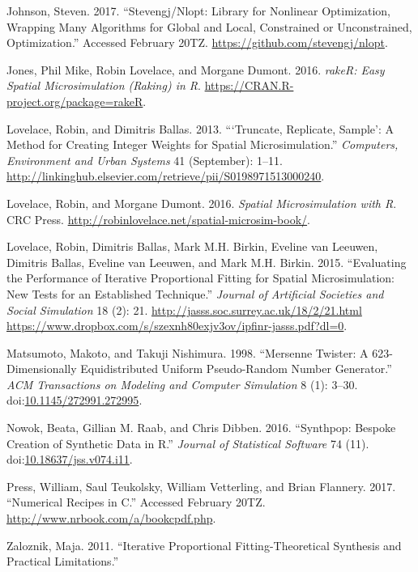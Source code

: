 \documentclass[]{article}
\begin{document}
\hypertarget{ref-johnson_stevengjux2fnlopt:_nodate}{}
Johnson, Steven. 2017. ``Stevengj/Nlopt: Library for Nonlinear
Optimization, Wrapping Many Algorithms for Global and Local, Constrained
or Unconstrained, Optimization.'' Accessed February 20TZ.
\url{https://github.com/stevengj/nlopt}.

\hypertarget{ref-jones_raker:_2016}{}
Jones, Phil Mike, Robin Lovelace, and Morgane Dumont. 2016. \emph{rakeR:
Easy Spatial Microsimulation (Raking) in R}.
\url{https://CRAN.R-project.org/package=rakeR}.

\hypertarget{ref-lovelace_truncate_2013}{}
Lovelace, Robin, and Dimitris Ballas. 2013. ```Truncate, Replicate,
Sample': A Method for Creating Integer Weights for Spatial
Microsimulation.'' \emph{Computers, Environment and Urban Systems} 41
(September): 1--11.
\url{http://linkinghub.elsevier.com/retrieve/pii/S0198971513000240}.

\hypertarget{ref-lovelace_spatial_2016}{}
Lovelace, Robin, and Morgane Dumont. 2016. \emph{Spatial Microsimulation
with R}. CRC Press.
\url{http://robinlovelace.net/spatial-microsim-book/}.

\hypertarget{ref-lovelace_evaluating_2015}{}
Lovelace, Robin, Dimitris Ballas, Mark M.H. Birkin, Eveline van Leeuwen,
Dimitris Ballas, Eveline van Leeuwen, and Mark M.H. Birkin. 2015.
``Evaluating the Performance of Iterative Proportional Fitting for
Spatial Microsimulation: New Tests for an Established Technique.''
\emph{Journal of Artificial Societies and Social Simulation} 18 (2): 21.
\href{http://jasss.soc.surrey.ac.uk/18/2/21.html\%20https://www.dropbox.com/s/szexnh80exjv3ov/ipfinr-jasss.pdf?dl=0}{http://jasss.soc.surrey.ac.uk/18/2/21.html https://www.dropbox.com/s/szexnh80exjv3ov/ipfinr-jasss.pdf?dl=0}.

\hypertarget{ref-matsumoto_mersenne_1998}{}
Matsumoto, Makoto, and Takuji Nishimura. 1998. ``Mersenne Twister: A
623-Dimensionally Equidistributed Uniform Pseudo-Random Number
Generator.'' \emph{ACM Transactions on Modeling and Computer Simulation}
8 (1): 3--30.
doi:\href{https://doi.org/10.1145/272991.272995}{10.1145/272991.272995}.

\hypertarget{ref-nowok_synthpop:_2016}{}
Nowok, Beata, Gillian M. Raab, and Chris Dibben. 2016. ``Synthpop:
Bespoke Creation of Synthetic Data in R.'' \emph{Journal of Statistical
Software} 74 (11).
doi:\href{https://doi.org/10.18637/jss.v074.i11}{10.18637/jss.v074.i11}.

\hypertarget{ref-press_numerical_nodate}{}
Press, William, Saul Teukolsky, William Vetterling, and Brian Flannery.
2017. ``Numerical Recipes in C.'' Accessed February 20TZ.
\url{http://www.nrbook.com/a/bookcpdf.php}.

\hypertarget{ref-zaloznik_iterative_2011}{}
Zaloznik, Maja. 2011. ``Iterative Proportional Fitting-Theoretical
Synthesis and Practical Limitations.''
\end{document}

